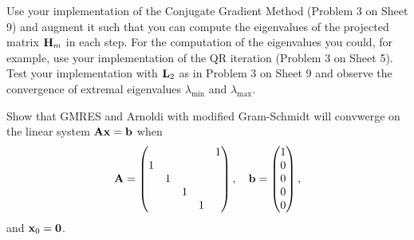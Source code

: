 
\begin{Sheet}
  \label{sheet11}
  
\begin{Problem}
	Use your implementation of the Conjugate Gradient Method (Problem 3 on Sheet 9) and 
  	augment it such that you can compute the eigenvalues of the projected matrix $\mathbf H_m$ in each step.
  	For the computation of the eigenvalues you could, for example, use your implementation of the QR iteration (Problem 3 on Sheet 5).
  	Test your implementation with $\mathbf L_2$ as in Problem 3 on Sheet 9 and observe the convergence of extremal eigenvalues $\lambda_{\text{min}}$ and $\lambda_{\text{max}}$.
\end{Problem}
  
	\begin{Problem}
		Show that GMRES and Arnoldi with modified Gram-Schmidt will convwerge on the linear system $\mathbf A\mathbf x = \mathbf b$ when
		\begin{gather*}
			\mathbf A = 
			\begin{pmatrix}
				&&&&1\\
				1&&&&\\
				&1&&&\\
				&&1&&\\
				&&&1&
			\end{pmatrix},
			\quad
			\mathbf b = 
			\begin{pmatrix}
				1\\ 0\\ 0 \\ 0\\ 0\\
			\end{pmatrix},
		\end{gather*}
		and $\mathbf x_0 = \boldsymbol 0$.
	\end{Problem}
\end{Sheet}


